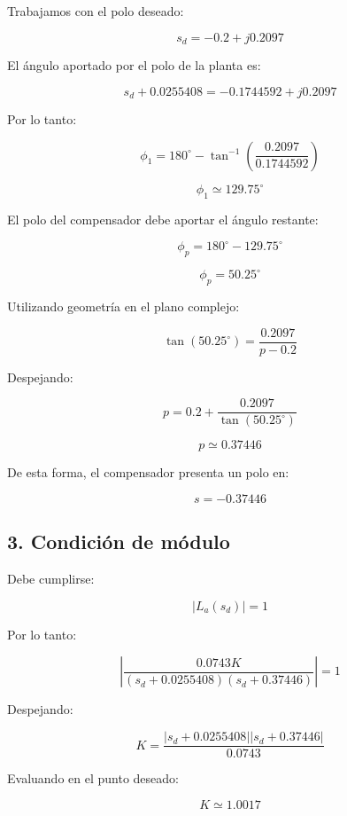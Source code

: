 \documentclass[10pt]{article}
\begin{document}
Trabajamos con el polo deseado:

\[
s_d=-0.2+j0.2097
\]

El ángulo aportado por el polo de
la planta es:

\[
s_d+0.0255408
=
-0.1744592+j0.2097
\]

Por lo tanto:

\[
\phi_1=
180^\circ-
\tan^{-1}
\left(
\frac{0.2097}{0.1744592}
\right)
\]

\begin{equation}
    \boxed{\phi_1\simeq129.75^\circ}
\end{equation}

El polo del compensador debe aportar
el ángulo restante:

\[
\phi_p=180^\circ-129.75^\circ
\]

\begin{equation}
    \boxed{\phi_p=50.25^\circ}
\end{equation}

Utilizando geometría en el plano complejo:

\[
\tan(50.25^\circ)
=
\frac{0.2097}{p-0.2}
\]

Despejando:

\[
p=0.2+
\frac{0.2097}{\tan(50.25^\circ)}
\]

\begin{equation}
    \boxed{p\simeq0.37446}
\end{equation}

De esta forma, el compensador presenta
un polo en:

\[
s=-0.37446
\]

\subsection*{3. Condición de módulo}

Debe cumplirse:

\begin{equation}
    |L_a(s_d)|=1
\end{equation}

Por lo tanto:

\[
\left|
\frac{0.0743K}
{(s_d+0.0255408)(s_d+0.37446)}
\right|=1
\]

Despejando:

\[
K=
\frac{
|s_d+0.0255408|
|s_d+0.37446|
}{0.0743}
\]

Evaluando en el punto deseado:

\begin{equation}
    \boxed{K\simeq1.0017}
\end{equation}
\end{document}
